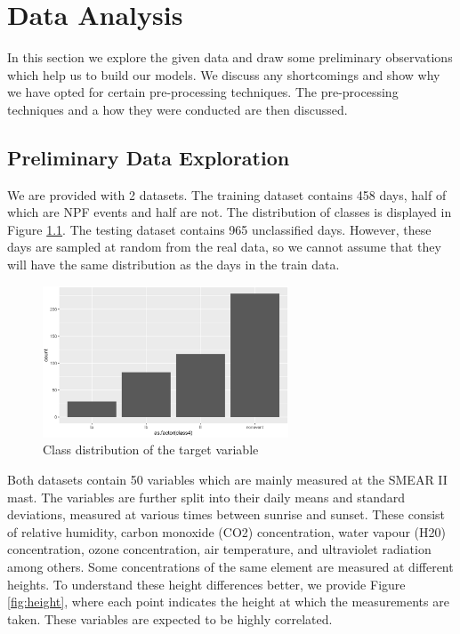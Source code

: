 \chapter{Data Analysis}

In this section we explore the given data and draw some preliminary observations which help us to build our models. We discuss any shortcomings and show why we have opted for certain pre-processing techniques. The pre-processing techniques and a how they were conducted are then discussed.

\section{Preliminary Data Exploration}

We are provided with 2 datasets. The training dataset contains 458 days, half of which are NPF events and half are not. The distribution of classes is displayed in Figure \ref{fig:class_distribution}. The testing dataset contains 965 unclassified days. However, these days are sampled at random from the real data, so we cannot assume that they will have the same distribution as the days in the train data.

\begin{figure}[!ht]
   \centering
   \includegraphics[width=0.65\textwidth]{images/class_distribution.png}
   \caption{Class distribution of the target variable}
   \label{fig:class_distribution}
\end{figure}


Both datasets contain 50 variables which are mainly measured at the SMEAR II mast. The variables are further split into their daily means and standard deviations, measured at various times between sunrise and sunset. These consist of relative humidity, carbon monoxide (CO2) concentration, water vapour (H20) concentration, ozone concentration, air temperature, and ultraviolet radiation among others. Some concentrations of the same element are measured at different heights. To understand these height differences better, we provide Figure \ref{fig:height}, where each point indicates the height at which the measurements are taken. These variables are expected to be highly correlated.

